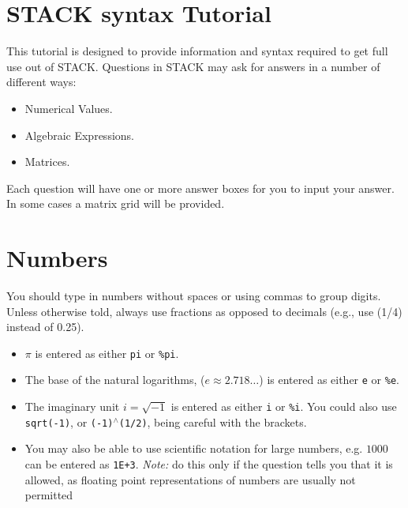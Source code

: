 \documentclass[a4paper]{article}
\newcommand{\stack}[1]{{\color{red}\tt #1}}
\begin{document}
\begin{multicols}{2}
\section*{STACK syntax Tutorial}
This tutorial is designed to provide information and syntax required to get full use out of STACK. Questions in STACK may ask for answers in a number of different ways:
\begin{itemize}
\item Numerical Values.
\item Algebraic Expressions.
\item Matrices.
\end{itemize}
Each question will have one or more answer boxes for you to input your answer.  In some cases a matrix grid will be provided.

\section*{Numbers}
You should type in numbers without spaces or using commas to group digits.  Unless otherwise told, always use fractions as opposed to decimals (e.g., use (1/4) instead of 0.25).
\begin{itemize}
\item $\pi$ is entered as either \stack{pi} or \stack{\%pi}.
\item The base of the natural logarithms, ($e \approx 2.718 \dots$) is entered as either \stack{e} or \stack{\%e}.
\item The imaginary unit $i=\sqrt{-1}$ is entered as either \stack{i} or \stack{\%i}. You could also use \stack{sqrt(-1)}, or \stack{(-1)$^{\wedge}$(1/2)}, being careful with the brackets.
\item You may also be able to use scientific notation for large numbers, e.g. $1000$ can be entered as \stack{1E+3}.
     {\em Note:} do this only if the question tells you that it is allowed, as floating point representations of numbers are usually not permitted
\end{itemize}


\end{multicols}
\end{document}
